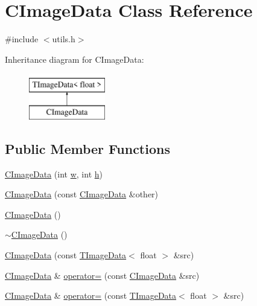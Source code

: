 \hypertarget{class_c_image_data}{}\section{C\+Image\+Data Class Reference}
\label{class_c_image_data}


{\ttfamily \#include $<$utils.\+h$>$}

Inheritance diagram for C\+Image\+Data\+:\begin{figure}[H]
\begin{center}
\leavevmode
\includegraphics[height=2.000000cm]{class_c_image_data}
\end{center}
\end{figure}
\subsection*{Public Member Functions}
\begin{DoxyCompactItemize}
\item 
\hyperlink{class_c_image_data_a7aeb8d37e489584c23a9fa3978d81daa}{C\+Image\+Data} (int \hyperlink{struct_t_image_data_aa46faa6f66f9d6f93c65e14aea643eb3}{w}, int \hyperlink{struct_t_image_data_a252235d07e487e8d02908aed062147bd}{h})
\item 
\hyperlink{class_c_image_data_afbaf8178890c617cbecaaf5eacaaf680}{C\+Image\+Data} (const \hyperlink{class_c_image_data}{C\+Image\+Data} \&other)
\item 
\hyperlink{class_c_image_data_acd1d3e5ea816f60e32c46bfcb7400f7e}{C\+Image\+Data} ()
\item 
\hyperlink{class_c_image_data_a2acb71bd47b7a401d313422095c3b6d4}{$\sim$\+C\+Image\+Data} ()
\item 
\hyperlink{class_c_image_data_a9ea043ce5278c6a0b671cf88bcd5cd40}{C\+Image\+Data} (const \hyperlink{struct_t_image_data}{T\+Image\+Data}$<$ float $>$ \&src)
\item 
\hyperlink{class_c_image_data}{C\+Image\+Data} \& \hyperlink{class_c_image_data_ae2f0ccb7b2f2ea0711e26518e3540f83}{operator=} (const \hyperlink{class_c_image_data}{C\+Image\+Data} \&src)
\item 
\hyperlink{class_c_image_data}{C\+Image\+Data} \& \hyperlink{class_c_image_data_aaa5ced0c590f609f69c88de7c664956e}{operator=} (const \hyperlink{struct_t_image_data}{T\+Image\+Data}$<$ float $>$ \&src)
\end{DoxyCompactItemize}
